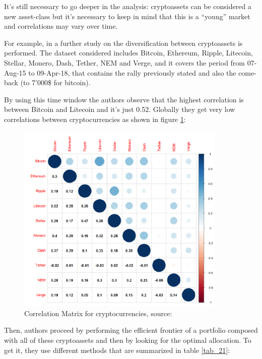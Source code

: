 It’s still necessary to go deeper in the analysis: cryptoassets can be considered a new asset-class but it’s necessary to keep in mind that this is a “young” market and correlations may vary over time.

For example, in \citep{weiyi} a further study on the diversification between cryptoassets is performed. The dataset considered includes Bitcoin, Ethereum, Ripple, Litecoin, Stellar, Monero, Dash, Tether, NEM and Verge, and it covers the period from 07-Aug-15 to 09-Apr-18, that contains the rally previously stated and also the come-back (to 7’000\$ for bitcoin).

By using this time window the authors observe that the highest correlation is between Bitcoin and Litecoin and it’s just 0.52. Globally they get very low correlations between cryptocurrencies as shown in figure \ref{corr_i}:
\begin{figure}[H]
		\centering
		\includegraphics[width=10cm]{Images/corrs_wei.png} %
		\caption{Correlation Matrix for cryptocurrencies, source: \citep{weiyi}}
		\label{corr_i}
\end{figure}
\bigskip

\noindent
Then, authors proceed by performing the efficient frontier of a portfolio composed with all of these cryptoassets and then by looking for the optimal allocation. To get it, they use different methods that are summarized in table \ref{tab_21}:

